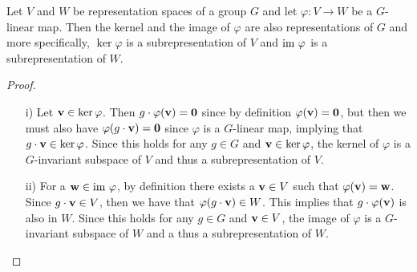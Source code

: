 \begin{proposition}\label{prop:kernelimagelinearmap}
	Let $V$ and $W$ be representation spaces of a group $G$ and let $\varphi: V \rightarrow W$ be a $G$-linear map. Then the kernel and the image of $\varphi$ are also representations of $G$ and more specifically, $\ker \varphi$ is a subrepresentation of $V$ and $\text{im } \varphi$ is a subrepresentation of $W$. 
\end{proposition}
\begin{proof}
	\begin{itemize}
		\item[i)] Let $\mathbf{v} \in \ker \varphi$. Then $g \cdot \varphi (\mathbf{v}) = \mathbf{0}$ since by definition $\varphi(\mathbf{v}) = \mathbf{0}$, but then we must also have $\varphi ( g \cdot \mathbf{v} ) = \mathbf{0}$ since $\varphi$ is a $G$-linear map, implying that $g \cdot \mathbf{v} \in \ker \varphi$. Since this holds for any $g \in G$ and $\mathbf{v} \in \ker \varphi$, the kernel of $\varphi$ is a $G$-invariant subspace of $V$ and thus a subrepresentation of $V$. %
		\item[ii)] For a $\mathbf{w} \in \text{im } \varphi$, by definition there exists a $\mathbf{v} \in V$ such that $\varphi(\mathbf{v}) = \mathbf{w}$. Since $g \cdot \mathbf{v} \in V$, then we have that $\varphi ( g \cdot \mathbf{v}) \in W$. This implies that $g \cdot \varphi (\mathbf{v})$ is also in $W$. Since this holds for any $g \in G$ and $\mathbf{v} \in V$, the image of $\varphi$ is a $G$-invariant subspace of $W$ and a thus a subrepresentation of $W$.	\qedhere
	\end{itemize}
\end{proof}

